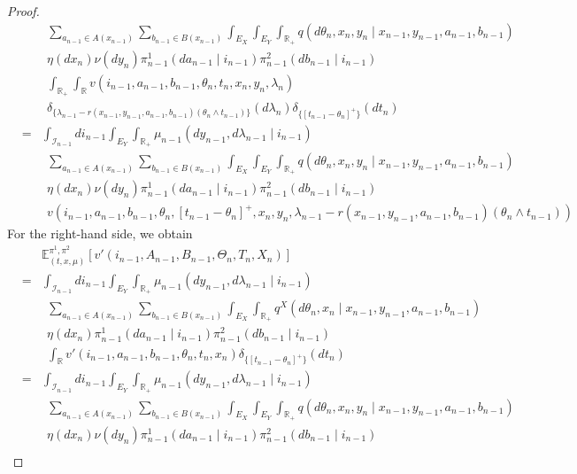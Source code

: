 \documentclass[10pt,a4paper]{amsart}
\begin{document}
\begin{proof}
\begin{eqnarray*}
&&~~
\sum_{a_{n-1}\in A(x_{n-1})}\sum_{b_{n-1}\in B(x_{n-1})}
\int_{E_X}\int_{E_Y}\int_{\mathbb{R}_+}
q(d\theta_n,x_n,y_n\mid x_{n-1},y_{n-1},a_{n-1},b_{n-1})\\
&&~~
\eta(dx_n)\nu(dy_n)
\pi^1_{n-1}(da_{n-1}\mid i_{n-1})\pi^2_{n-1}(db_{n-1}\mid i_{n-1})\\
&&~~
\int_{\mathbb{R}_+}\int_{\mathbb{R}}
v(i_{n-1},a_{n-1},b_{n-1},\theta_n,t_n,x_n,y_n,\lambda_n)\\
&&~~
\delta_{\{\lambda_{n-1}-r(x_{n-1},y_{n-1},a_{n-1},b_{n-1})(\theta_n\wedge t_{n-1})\}}(d\lambda_n)\delta_{\{[t_{n-1}-\theta_n]^+\}}(dt_n)\\
&=&\int_{\mathscr{I}_{n-1}}di_{n-1}
\int_{E_Y}\int_{\mathbb{R}_+}\mu_{n-1}(dy_{n-1},d\lambda_{n-1}\mid i_{n-1})\\
&&~~
\sum_{a_{n-1}\in A(x_{n-1})}\sum_{b_{n-1}\in B(x_{n-1})}
\int_{E_X}\int_{E_Y}\int_{\mathbb{R}_+}
q(d\theta_n,x_n,y_n\mid x_{n-1},y_{n-1},a_{n-1},b_{n-1})\\
&&~~
\eta(dx_n)\nu(dy_n)
\pi^1_{n-1}(da_{n-1}\mid i_{n-1})\pi^2_{n-1}(db_{n-1}\mid i_{n-1})\\
&&~~
v(i_{n-1},a_{n-1},b_{n-1},\theta_n,[t_{n-1}-\theta_n]^+,x_n,y_n,
\lambda_{n-1}-r(x_{n-1},y_{n-1},a_{n-1},b_{n-1})(\theta_n\wedge t_{n-1}))
\end{eqnarray*}
For the right-hand side, we obtain
\begin{eqnarray*}
&&\mathbb{E}^{\pi^1,\pi^2}_{(t,x,\mu)}[v'(i_{n-1},A_{n-1},B_{n-1},\Theta_n,T_n,X_n)]\\
&=&\int_{\mathscr{I}_{n-1}}di_{n-1}
\int_{E_Y}\int_{\mathbb{R}_+}\mu_{n-1}(dy_{n-1},d\lambda_{n-1}\mid i_{n-1})\\
&&~~
\sum_{a_{n-1}\in A(x_{n-1})}\sum_{b_{n-1}\in B(x_{n-1})}
\int_{E_X}\int_{\mathbb{R}_+}
q^X(d\theta_n,x_n\mid x_{n-1},y_{n-1},a_{n-1},b_{n-1})\\
&&~~
\eta(dx_n)
\pi^1_{n-1}(da_{n-1}\mid i_{n-1})\pi^2_{n-1}(db_{n-1}\mid i_{n-1})\\
&&~~
\int_{\mathbb{R}}v'(i_{n-1},a_{n-1},b_{n-1},\theta_n,t_n,x_n)
\delta_{\{[t_{n-1}-\theta_n]^+\}}(dt_n)\\
&=&\int_{\mathscr{I}_{n-1}}di_{n-1}
\int_{E_Y}\int_{\mathbb{R}_+}\mu_{n-1}(dy_{n-1},d\lambda_{n-1}\mid i_{n-1})\\
&&~~
\sum_{a_{n-1}\in A(x_{n-1})}\sum_{b_{n-1}\in B(x_{n-1})}
\int_{E_X}\int_{E_Y}\int_{\mathbb{R}_+}
q(d\theta_n,x_n,y_n\mid x_{n-1},y_{n-1},a_{n-1},b_{n-1})\\
&&~~
\eta(dx_n)\nu(dy_n)
\pi^1_{n-1}(da_{n-1}\mid i_{n-1})\pi^2_{n-1}(db_{n-1}\mid i_{n-1})\\

\end{eqnarray*}
\end{proof}
\end{document}
